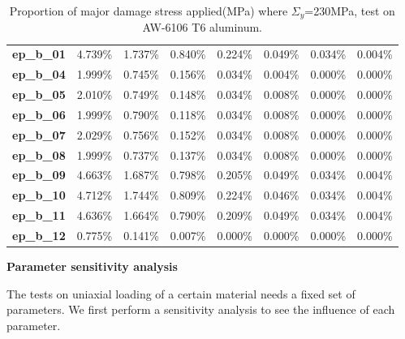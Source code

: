 \documentclass[3p,times,number,review]{elsarticle}
\begin{document}
\begin{table}[!h]
\begin{tabular}{llllllll}
		\textbf{ep\_b\_01}           & 4.739\%        & 1.737\%        & 0.840\%        & 0.224\%         & 0.049\%         & 0.034\%         & 0.004\%         \\
		\textbf{ep\_b\_04}           & 1.999\%        & 0.745\%        & 0.156\%        & 0.034\%         & 0.004\%         & 0.000\%         & 0.000\%         \\
		\textbf{ep\_b\_05}           & 2.010\%        & 0.749\%        & 0.148\%        & 0.034\%         & 0.008\%         & 0.000\%         & 0.000\%         \\
		\textbf{ep\_b\_06}           & 1.999\%        & 0.790\%        & 0.118\%        & 0.034\%         & 0.008\%         & 0.000\%         & 0.000\%         \\
		\textbf{ep\_b\_07}           & 2.029\%        & 0.756\%        & 0.152\%        & 0.034\%         & 0.008\%         & 0.000\%         & 0.000\%         \\
		\textbf{ep\_b\_08}           & 1.999\%        & 0.737\%        & 0.137\%        & 0.034\%         & 0.008\%         & 0.000\%         & 0.000\%         \\
		\textbf{ep\_b\_09}           & 4.663\%        & 1.687\%        & 0.798\%        & 0.205\%         & 0.049\%         & 0.034\%         & 0.004\%         \\
		\textbf{ep\_b\_10}           & 4.712\%        & 1.744\%        & 0.809\%        & 0.224\%         & 0.046\%         & 0.034\%         & 0.004\%         \\
		\textbf{ep\_b\_11}           & 4.636\%        & 1.664\%        & 0.790\%        & 0.209\%         & 0.049\%         & 0.034\%         & 0.004\%         \\
		\textbf{ep\_b\_12}           & 0.775\%        & 0.141\%        & 0.007\%        & 0.000\%         & 0.000\%         & 0.000\%         & 0.000\%         \\ \hline
	\end{tabular}
	\caption{Proportion of major damage stress applied(MPa) where $\Sigma_y$=230MPa, test on AW-6106 T6
		aluminum.}
	\label{tab.majordamage}
\end{table}





\textbf{Parameter sensitivity analysis}

The tests on uniaxial loading of a certain material needs a fixed set of parameters. We first perform a sensitivity analysis to see the influence of each parameter. 
\end{document}
